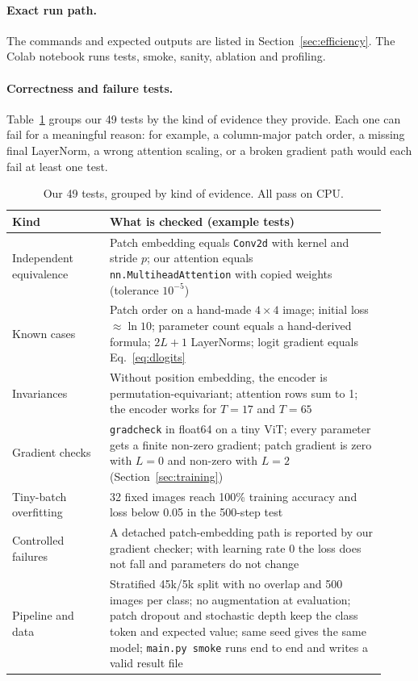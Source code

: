 \documentclass{article}
\begin{document}
\paragraph{Exact run path.}
The commands and expected outputs are listed in Section~\ref{sec:efficiency}. The Colab notebook runs tests, smoke, sanity, ablation and profiling.

\paragraph{Correctness and failure tests.}
Table~\ref{tab:tests} groups our 49 tests by the kind of evidence they
provide. Each one can fail for a meaningful reason: for example, a
column-major patch order, a missing final LayerNorm, a wrong attention
scaling, or a broken gradient path would each fail at least one test.

\begin{table}[h]
\caption{Our 49 tests, grouped by kind of evidence. All pass on CPU.}
\label{tab:tests}
\centering
\small
\begin{tabular}{p{0.24\linewidth}p{0.68\linewidth}}
\toprule
Kind & What is checked (example tests) \\
\midrule
Independent equivalence
  & Patch embedding equals \texttt{Conv2d} with kernel and stride $p$;
    our attention equals \texttt{nn.MultiheadAttention} with copied weights
    (tolerance $10^{-5}$) \\
Known cases
  & Patch order on a hand-made $4\times4$ image; initial loss
    $\approx \ln 10$; parameter count equals a hand-derived formula;
    $2L{+}1$ LayerNorms; logit gradient equals Eq.~\ref{eq:dlogits} \\
Invariances
  & Without position embedding, the encoder is permutation-equivariant;
    attention rows sum to 1; the encoder works for $T{=}17$ and $T{=}65$ \\
Gradient checks
  & \texttt{gradcheck} in float64 on a tiny ViT; every parameter gets a
    finite non-zero gradient; patch gradient is zero with $L{=}0$ and
    non-zero with $L{=}2$ (Section~\ref{sec:training}) \\
Tiny-batch overfitting
  & 32 fixed images reach 100\% training accuracy and loss below 0.05
    in the 500-step test \\
Controlled failures
  & A detached patch-embedding path is reported by our gradient checker;
    with learning rate 0 the loss does not fall and parameters do not change \\
Pipeline and data
  & Stratified 45k/5k split with no overlap and 500 images per class;
    no augmentation at evaluation; patch dropout and stochastic depth keep
    the class token and expected value; same seed gives the same model;
    \texttt{main.py smoke} runs end to end and writes a valid result file \\
\bottomrule
\end{tabular}
\end{table}
\end{document}

